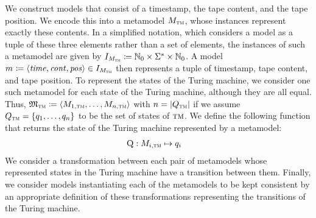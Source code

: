 We construct models that consist of a timestamp, the tape content, and the tape position.
We encode this into a metamodel $\metamodel{M}{\TuringMachine}$, whose instances represent exactly these contents.
In a simplified notation, which considers a model as a tuple of these three elements rather than a set of elements, the instances of such a metamodel are given by $\metamodelinstanceset{M}{\TuringMachine} \equalsperdefinition \mathbb{N}_0 \times \Sigma^* \times \mathbb{N}_0$.
A model $\model{m}{} \equalsperdefinition \tupled{\mathvariable{time}, \mathvariable{cont}, \mathvariable{pos}} \in \metamodelinstanceset{M}{\TuringMachine}$ then represents a tuple of timestamp, tape content, and tape position.
To represent the states of the Turing machine, we consider one such metamodel for each state of the Turing machine, although they are all equal.
Thus, $\metamodeltuple{M}_\TuringMachine \equalsperdefinition \tupled{\metamodel{M}{1, \TuringMachine}, \dots, \metamodel{M}{n, \TuringMachine}}$ with $n = \lvert Q_{\textsc{tm}}\rvert$ if we assume $Q_{\textsc{tm}} = \{ q_1, \dots, q_n \}$ to be the set of states of $\textsc{tm}$.
We define the following function that returns the state of the Turing machine represented by a metamodel:
\begin{align*}
     \function{Q} : \metamodel{M}{i,\TuringMachine} & \mapsto q_i
\end{align*}
We consider a transformation between each pair of metamodels whose represented states in the Turing machine have a transition between them.
Finally, we consider models instantiating each of the metamodels to be kept consistent by an appropriate definition of these transformations representing the transitions of the Turing machine.

